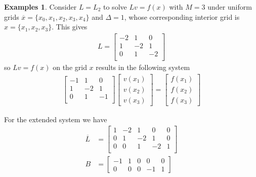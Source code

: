 \documentclass[11pt]{article}
\theoremstyle{definition}
\newtheorem{example}{Examples}[section]
\begin{document}
\begin{example}\label{ex:gaussian-elimination-reflecting-barrier}
	Consider $L = L_{2}$ to solve $L v = f(x)$ with $M = 3$ under uniform grids $\overline{x} = \{x_0, x_1, x_2, x_3, x_4\}$ and $\Delta = 1$, whose corresponding interior grid is $x = \{x_1, x_2, x_3\}$. This gives
	\begin{align}
	L = 	 \begin{bmatrix}
	-2 & 1 & 0 \\
	1 & -2 & 1 \\
	0 & 1 & -2 \\
	\end{bmatrix}
	\end{align}
	so $L v= f(x)$ on the grid $x$ results in the following system
	\begin{align} \label{eq:extended-system-reflecting-barrier-reduced-system}
	\begin{bmatrix}
	-1 & 1 & 0  \\
	1 & -2 & 1 \\
	0 & 1 & -1 \\
	\end{bmatrix} 	  \begin{bmatrix}
	v(x_1) \\
	v(x_2) \\
	v(x_3) 
	\end{bmatrix}
	= 
	\begin{bmatrix}
	f(x_1) \\
	f(x_2) \\
	f(x_3) 
	\end{bmatrix} 
	\end{align}
	
	
	For the extended system we have
	\begin{align}
	\overline{L} &= 
	\begin{bmatrix}
	1 & -2 & 1 & 0 & 0 \\
	0 & 1 & -2 & 1 & 0 \\
	0 & 0 & 1 & -2 & 1 \\
	\end{bmatrix} \\
	B &= \begin{bmatrix}
	-1 & 1  & 0 & 0 & 0 \\
	0 & 0 & 0 & -1 & 1
	\end{bmatrix}
	\end{align}
	

\end{example}
\end{document}
